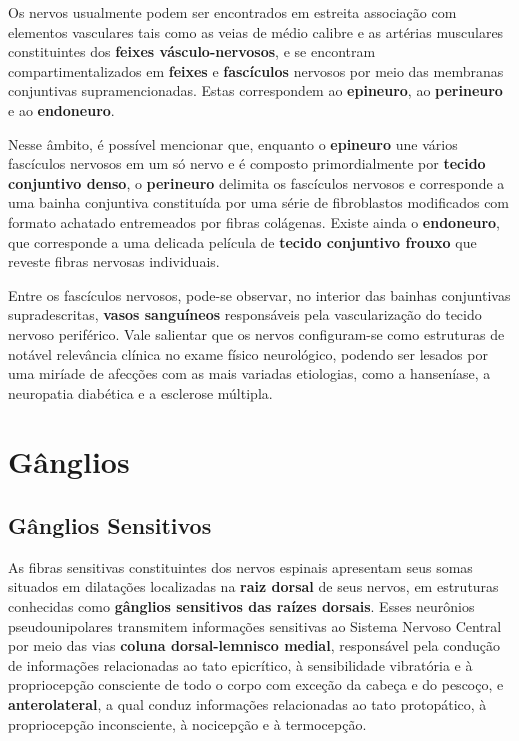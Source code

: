 \documentclass[
]{book}
\theoremstyle{definition}
\theoremstyle{definition}
\theoremstyle{definition}
\theoremstyle{definition}
\theoremstyle{remark}
\begin{document}
Os nervos usualmente podem ser encontrados em estreita associação com elementos vasculares tais como as veias de médio calibre e as artérias musculares constituintes dos \textbf{feixes vásculo-nervosos}, e se encontram compartimentalizados em \textbf{feixes} e \textbf{fascículos} nervosos por meio das membranas conjuntivas supramencionadas. Estas correspondem ao \textbf{epineuro}, ao \textbf{perineuro} e ao \textbf{endoneuro}.

Nesse âmbito, é possível mencionar que, enquanto o \textbf{epineuro} une vários fascículos nervosos em um só nervo e é composto primordialmente por \textbf{tecido conjuntivo denso}, o \textbf{perineuro} delimita os fascículos nervosos e corresponde a uma bainha conjuntiva constituída por uma série de fibroblastos modificados com formato achatado entremeados por fibras colágenas. Existe ainda o \textbf{endoneuro}, que corresponde a uma delicada película de \textbf{tecido conjuntivo frouxo} que reveste fibras nervosas individuais.

Entre os fascículos nervosos, pode-se observar, no interior das bainhas conjuntivas supradescritas, \textbf{vasos sanguíneos} responsáveis pela vascularização do tecido nervoso periférico. Vale salientar que os nervos configuram-se como estruturas de notável relevância clínica no exame físico neurológico, podendo ser lesados por uma miríade de afecções com as mais variadas etiologias, como a hanseníase, a neuropatia diabética e a esclerose múltipla.

\hypertarget{guxe2nglios}{%
\chapter{Gânglios}\label{guxe2nglios}}

\hypertarget{guxe2nglios-sensitivos}{%
\section{Gânglios Sensitivos}\label{guxe2nglios-sensitivos}}

As fibras sensitivas constituintes dos nervos espinais apresentam seus somas situados em dilatações localizadas na \textbf{raiz dorsal} de seus nervos, em estruturas conhecidas como \textbf{gânglios sensitivos das raízes dorsais}. Esses neurônios pseudounipolares transmitem informações sensitivas ao Sistema Nervoso Central por meio das vias \textbf{coluna dorsal-lemnisco medial}, responsável pela condução de informações relacionadas ao tato epicrítico, à sensibilidade vibratória e à propriocepção consciente de todo o corpo com exceção da cabeça e do pescoço, e \textbf{anterolateral}, a qual conduz informações relacionadas ao tato protopático, à propriocepção inconsciente, à nocicepção e à termocepção.
\end{document}
